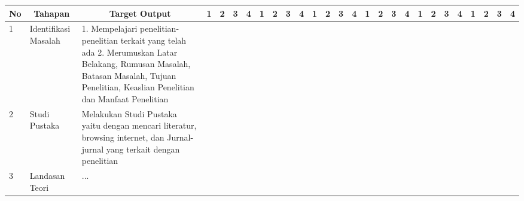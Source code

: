 \documentclass[oneside,listof=totoc]{scrbook}
\begin{document}
\begin{table}
\begin{minipage}{\textwidth}
\begin{longtable}{|l|p{3.0cm}|p{4.5cm}|l|l|l|l|l|l|l|l|l|l|l|l|l|l|l|l|l|l|l|l|l|l|l|l|}
  \multicolumn{1}{|c|}{\multirow{-3}{*}{\cellcolor[HTML]{DEEAF6}\textbf{No}}} & \multicolumn{1}{c|}{\multirow{-3}{*}{\cellcolor[HTML]{DEEAF6}\textbf{Tahapan}}} & \multicolumn{1}{c|}{\multirow{-3}{*}{\cellcolor[HTML]{DEEAF6}\textbf{Target Output}}} & \multicolumn{1}{c|}{\cellcolor[HTML]{DEEAF6}\textbf{1}} & \multicolumn{1}{c|}{\cellcolor[HTML]{DEEAF6}\textbf{2}} & \multicolumn{1}{c|}{\cellcolor[HTML]{DEEAF6}\textbf{3}} & \multicolumn{1}{c|}{\cellcolor[HTML]{DEEAF6}\textbf{4}} & \multicolumn{1}{c|}{\cellcolor[HTML]{DEEAF6}\textbf{1}} & \multicolumn{1}{c|}{\cellcolor[HTML]{DEEAF6}\textbf{2}} & \multicolumn{1}{c|}{\cellcolor[HTML]{DEEAF6}\textbf{3}} & \multicolumn{1}{c|}{\cellcolor[HTML]{DEEAF6}\textbf{4}} & \multicolumn{1}{c|}{\cellcolor[HTML]{DEEAF6}\textbf{1}} & \multicolumn{1}{c|}{\cellcolor[HTML]{DEEAF6}\textbf{2}} & \multicolumn{1}{c|}{\cellcolor[HTML]{DEEAF6}\textbf{3}} & \multicolumn{1}{c|}{\cellcolor[HTML]{DEEAF6}\textbf{4}} & \multicolumn{1}{c|}{\cellcolor[HTML]{DEEAF6}\textbf{1}} & \multicolumn{1}{c|}{\cellcolor[HTML]{DEEAF6}\textbf{2}} & \multicolumn{1}{c|}{\cellcolor[HTML]{DEEAF6}\textbf{3}} & \multicolumn{1}{c|}{\cellcolor[HTML]{DEEAF6}\textbf{4}} & \multicolumn{1}{c|}{\cellcolor[HTML]{DEEAF6}\textbf{1}} & \multicolumn{1}{c|}{\cellcolor[HTML]{DEEAF6}\textbf{2}} & \multicolumn{1}{c|}{\cellcolor[HTML]{DEEAF6}\textbf{3}} & \multicolumn{1}{c|}{\cellcolor[HTML]{DEEAF6}\textbf{4}} & \multicolumn{1}{c|}{\cellcolor[HTML]{DEEAF6}\textbf{1}} & \multicolumn{1}{c|}{\cellcolor[HTML]{DEEAF6}\textbf{2}} & \multicolumn{1}{c|}{\cellcolor[HTML]{DEEAF6}\textbf{3}} & \multicolumn{1}{c|}{\cellcolor[HTML]{DEEAF6}\textbf{4}} \\ \hline
  1 & Identifikasi Masalah & 1. Mempelajari penelitian-penelitian terkait yang telah ada 2. Merumuskan Latar Belakang, Rumusan Masalah, Batasan Masalah, Tujuan Penelitian, Keaslian Penelitian dan Manfaat Penelitian & \cellcolor[HTML]{5B9BD5} & \cellcolor[HTML]{5B9BD5} &  &  &  &  &  &  &  &  &  &  &  &  &  &  &  &  &  &  &  &  &  & \\ \hline
  2 & Studi Pustaka & Melakukan Studi Pustaka yaitu dengan mencari literatur, browsing internet, dan Jurnal-jurnal yang terkait dengan penelitian &  &  & \cellcolor[HTML]{5B9BD5} & \cellcolor[HTML]{5B9BD5} &  &  &  &  &  &  &  &  &  &  &  &  &  &  &  &  &  &  &  & \\ \hline
  3 & Landasan Teori & ... &  &  &  &  & \cellcolor[HTML]{5B9BD5} & \cellcolor[HTML]{5B9BD5} & \cellcolor[HTML]{5B9BD5} & \cellcolor[HTML]{5B9BD5} &  &  &  &  &  &  &  &  &  &  &  &  &  &  &  & \\ \hline

\end{longtable}
\end{minipage}
\end{table}
\end{document}
